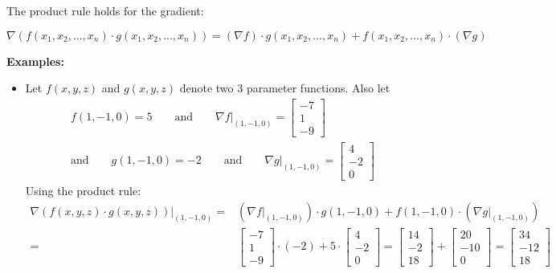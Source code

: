 \documentclass{article}
\begin{document}
\vspace{5mm}

The product rule holds for the gradient:

\[\nabla (f(x_1, x_2, ..., x_n) \cdot g(x_1, x_2, ..., x_n)) = (\nabla f) \cdot g(x_1, x_2, ..., x_n) + f(x_1, x_2, ..., x_n) \cdot (\nabla g)\]

\textbf{Examples:}
\begin{itemize}
\item Let \(f(x, y, z)\) and \(g(x, y, z)\) denote two 3 parameter functions. Also let 
\begin{align*}
& f(1, -1, 0) = 5 \quad\quad\text{and}\quad\quad \left.\nabla f \right|_{(1, -1, 0)} = \begin{bmatrix} -7 \\ 1 \\ -9 \end{bmatrix} \\ 
& \text{and}\quad\quad g(1, -1, 0) = -2 \quad\quad\text{and}\quad\quad \left.\nabla g \right|_{(1, -1, 0)} = \begin{bmatrix} 4 \\ -2 \\ 0 \end{bmatrix}
\end{align*}
Using the product rule: 
\begin{align*}
\left.\nabla (f(x, y, z) \cdot g(x, y, z)) \right|_{(1, -1, 0)} = & \left(\left.\nabla f \right|_{(1, -1, 0)}\right) \cdot g(1, -1, 0) + f(1, -1, 0) \cdot \left(\left. \nabla g \right|_{(1, -1, 0)}\right) \\ 
= & \begin{bmatrix} -7 \\ 1 \\ -9 \end{bmatrix} \cdot (-2) + 5 \cdot \begin{bmatrix} 4 \\ -2 \\ 0 \end{bmatrix} 
= \begin{bmatrix} 14 \\ -2 \\ 18 \end{bmatrix} + \begin{bmatrix} 20 \\ -10 \\ 0 \end{bmatrix} 
= \begin{bmatrix} 34 \\ -12 \\ 18 \end{bmatrix}
\end{align*}
\end{itemize}
\end{document}
